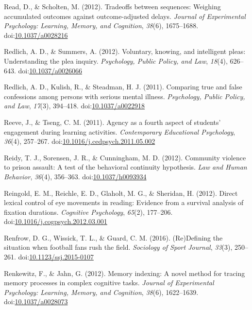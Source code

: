 \documentclass[english,man]{apa6}
\theoremstyle{definition}
\theoremstyle{definition}
\theoremstyle{definition}
\theoremstyle{remark}
\begin{document}
\hypertarget{ref-Read2012}{}
Read, D., \& Scholten, M. (2012). Tradeoffs between sequences: Weighing
accumulated outcomes against outcome-adjusted delays. \emph{Journal of
Experimental Psychology: Learning, Memory, and Cognition}, \emph{38}(6),
1675--1688.
doi:\href{https://doi.org/10.1037/a0028216}{10.1037/a0028216}

\hypertarget{ref-Redlich2012}{}
Redlich, A. D., \& Summers, A. (2012). Voluntary, knowing, and
intelligent pleas: Understanding the plea inquiry. \emph{Psychology,
Public Policy, and Law}, \emph{18}(4), 626--643.
doi:\href{https://doi.org/10.1037/a0026066}{10.1037/a0026066}

\hypertarget{ref-Redlich2011}{}
Redlich, A. D., Kulish, R., \& Steadman, H. J. (2011). Comparing true
and false confessions among persons with serious mental illness.
\emph{Psychology, Public Policy, and Law}, \emph{17}(3), 394--418.
doi:\href{https://doi.org/10.1037/a0022918}{10.1037/a0022918}

\hypertarget{ref-Reeve2011}{}
Reeve, J., \& Tseng, C. M. (2011). Agency as a fourth aspect of
students' engagement during learning activities. \emph{Contemporary
Educational Psychology}, \emph{36}(4), 257--267.
doi:\href{https://doi.org/10.1016/j.cedpsych.2011.05.002}{10.1016/j.cedpsych.2011.05.002}

\hypertarget{ref-Reidy2012}{}
Reidy, T. J., Sorensen, J. R., \& Cunningham, M. D. (2012). Community
violence to prison assault: A test of the behavioral continuity
hypothesis. \emph{Law and Human Behavior}, \emph{36}(4), 356--363.
doi:\href{https://doi.org/10.1037/h0093934}{10.1037/h0093934}

\hypertarget{ref-Reingold2012}{}
Reingold, E. M., Reichle, E. D., Glaholt, M. G., \& Sheridan, H. (2012).
Direct lexical control of eye movements in reading: Evidence from a
survival analysis of fixation durations. \emph{Cognitive Psychology},
\emph{65}(2), 177--206.
doi:\href{https://doi.org/10.1016/j.cogpsych.2012.03.001}{10.1016/j.cogpsych.2012.03.001}

\hypertarget{ref-Renfrow2016}{}
Renfrow, D. G., Wissick, T. L., \& Guard, C. M. (2016). (Re)Defining the
situation when football fans rush the field. \emph{Sociology of Sport
Journal}, \emph{33}(3), 250--261.
doi:\href{https://doi.org/10.1123/ssj.2015-0107}{10.1123/ssj.2015-0107}

\hypertarget{ref-Renkewitz2012}{}
Renkewitz, F., \& Jahn, G. (2012). Memory indexing: A novel method for
tracing memory processes in complex cognitive tasks. \emph{Journal of
Experimental Psychology: Learning, Memory, and Cognition}, \emph{38}(6),
1622--1639.
doi:\href{https://doi.org/10.1037/a0028073}{10.1037/a0028073}
\end{document}
